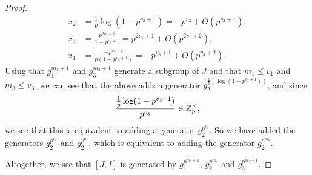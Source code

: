 \begin{proof}
\begin{align*}
    x_{2} &= \frac{1}{p}\log(1-p^{v_{3}+1}) = -p^{v_{3}} + O(p^{v_{3}+1}), \\
    x_{3} &= \frac{p^{2v_{3}+1}}{1-p^{v_{3}+1}} = p^{2v_{1}+1} + O(p^{2v_{1}+2}), \\
    x_{1} &= \frac{-p^{v_{3}+2}}{p(1-p^{v_{3}+1})} = -p^{v_{3}+1} + O(p^{v_{3}+2}).
  \end{align*}
  Using that $g_{1}^{m_{1}+1}$ and $g_{3}^{m_{3}+1}$ generate a subgroup of $J$ and that $m_{1}\leq v_{1}$ and $m_{3}\leq v_{3}$, we can see that the above adds a generator $g_{2}^{\frac{1}{p}(\log(1-p^{v_{3}+1}))}$, and since
  \begin{equation*}
    \frac{\frac{1}{p}\log(1-p^{v_{3}+1})}{p^{v_{3}}} \in \mathbb{Z}_{p}^{\times},
  \end{equation*}
  we see that this is equivalent to adding a generator $g_{2}^{p^{v_{3}}}$. So we have added the generators $g_{2}^{p^{v_{1}}}$ and $g_{2}^{p^{v_{3}}}$, which is equivalent to adding the generator $g_{2}^{p^{m_{2}}}$.

  Altogether, we see that $[J,I]$ is generated by $g_{1}^{p^{m_{1}+1}}$, $g_{2}^{p^{m_{2}}}$ and $g_{3}^{p^{m_{3}+1}}$.
\end{proof}

